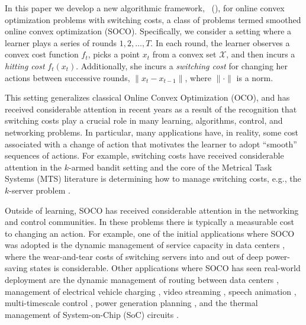 

In this paper we develop a new algorithmic framework, \ouralg\ (\ourack), for online convex optimization problems with switching costs, a class of problems termed smoothed online convex optimization (SOCO).  Specifically, we consider a setting where a learner plays a series of rounds $1,2,\ldots,T$. In each round, the learner observes a convex cost function $f_t$, picks a point $x_t$ from a convex set $\mathcal{X}$, and then incurs a \emph{hitting cost} $f_t(x_t)$. Additionally, she incurs a \emph{switching cost} for changing her actions between successive rounds, $\|x_t - x_{t-1}\|$, where $\|\cdot\|$ is a norm.  

This setting generalizes classical Online Convex Optimization (OCO), and has received considerable attention in recent years as a result of the recognition that switching costs play a crucial role in many learning, algorithms, control, and networking problems.  In particular, many applications have, in reality, some cost associated with a change of action that motivates the learner to adopt ``smooth'' sequences of actions.  For example, switching costs have received considerable attention in the $k$-armed bandit setting  \citep{agrawal1990multi, guha2009multi, koren2017multi} and the core of the Metrical Task Systems (MTS) literature is determining how to manage switching costs, e.g., the $k$-server problem \citep{borodin1992, borodin2005}. %

Outside of learning, SOCO has received considerable attention in the networking and control communities.  In these problems there is typically a measurable cost to changing an action.  For example, one of the initial applications where SOCO was adopted is the dynamic management of service capacity in data centers \citep{lin2011, lu2013simple}, where the wear-and-tear costs of switching servers into and out of deep power-saving states is considerable.  Other applications where SOCO has seen real-world deployment are the dynamic management of routing between data centers \citep{lin2012,wang2014exploring}, management of electrical vehicle charging \citep{kim2014real}, video streaming \citep{joseph2012jointly}, speech animation \citep{kim2015}, multi-timescale control \citep{goel2017thinking}, power generation planning \citep{badiei2015online}, and the thermal management of System-on-Chip (SoC) circuits \citep{zanini2009multicore,zanini2010online}. 


